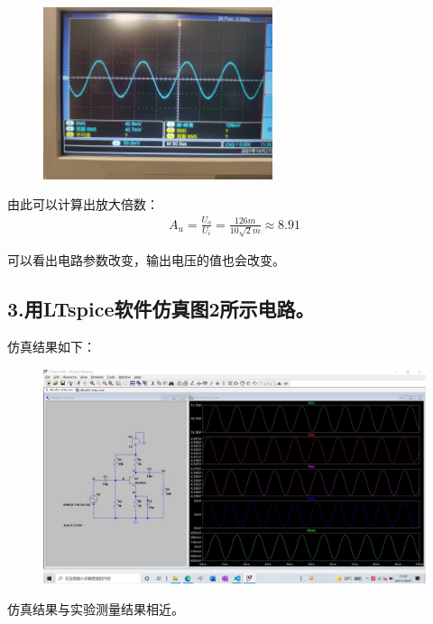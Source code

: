 \documentclass[UTF8]{ctexart}
\begin{document}
\begin{figure}[htbp]
        \centering
        \includegraphics[width=0.60\textwidth]{2-5.jpg}
\end{figure}

由此可以计算出放大倍数：
\begin{align}
        A_u = \frac{U_o}{U_i} = \frac{126m}{10\sqrt{2}m} \approx 8.91 
\end{align}

可以看出电路参数改变，输出电压的值也会改变。


\subsection*{3.用LTspice软件仿真图2所示电路。}

仿真结果如下：
\begin{figure}[htbp]
        \centering
        \includegraphics[width=1.0\textwidth]{2-3-1kHz仿真.jpg}
\end{figure}

仿真结果与实验测量结果相近。
\end{document}
